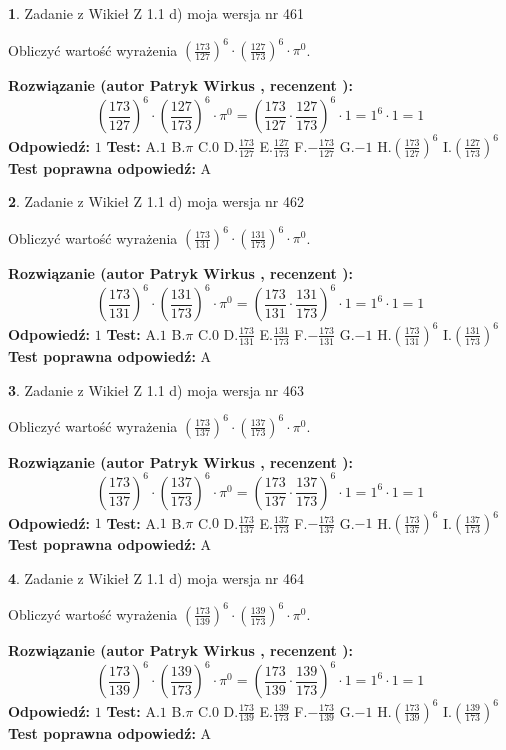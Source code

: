 \documentclass[12pt, a4paper]{article}
\theoremstyle{definition} %
\newtheorem{zad}{}
\newcommand{\zadStart}[1]{\begin{zad}#1\newline}
\newcommand{\zadStop}{\end{zad}}
\newcommand{\rozwStart}[2]{\noindent \textbf{Rozwiązanie (autor #1 , recenzent #2): }\newline}
\newcommand{\rozwStop}{\newline}
\newcommand{\odpStart}{\noindent \textbf{Odpowiedź:}\newline}
\newcommand{\odpStop}{\newline}
\newcommand{\testStart}{\noindent \textbf{Test:}\newline}
\newcommand{\testStop}{\newline}
\newcommand{\kluczStart}{\noindent \textbf{Test poprawna odpowiedź:}\newline}
\newcommand{\kluczStop}{\newline}
\begin{document}
\zadStart{Zadanie z Wikieł Z 1.1 d) moja wersja nr 461}

Obliczyć wartość wyrażenia $(\frac{173}{127})^{6} \cdot (\frac{127}{173})^{6} \cdot \pi^{0}$.
\zadStop
\rozwStart{Patryk Wirkus}{}
$$(\frac{173}{127})^{6} \cdot (\frac{127}{173})^{6} \cdot \pi^{0} = (\frac{173}{127} \cdot \frac{127}{173})^{6} \cdot 1 = 1^{6} \cdot 1 = 1$$
\rozwStop
\odpStart
$1$
\odpStop
\testStart
A.$1$ B.$\pi$ C.$0$ D.$\frac{173}{127}$ E.$\frac{127}{173}$
F.$-\frac{173}{127}$ G.$-1$
H.$(\frac{173}{127})^{6}$
I.$(\frac{127}{173})^{6}$
\testStop
\kluczStart
A
\kluczStop



\zadStart{Zadanie z Wikieł Z 1.1 d) moja wersja nr 462}

Obliczyć wartość wyrażenia $(\frac{173}{131})^{6} \cdot (\frac{131}{173})^{6} \cdot \pi^{0}$.
\zadStop
\rozwStart{Patryk Wirkus}{}
$$(\frac{173}{131})^{6} \cdot (\frac{131}{173})^{6} \cdot \pi^{0} = (\frac{173}{131} \cdot \frac{131}{173})^{6} \cdot 1 = 1^{6} \cdot 1 = 1$$
\rozwStop
\odpStart
$1$
\odpStop
\testStart
A.$1$ B.$\pi$ C.$0$ D.$\frac{173}{131}$ E.$\frac{131}{173}$
F.$-\frac{173}{131}$ G.$-1$
H.$(\frac{173}{131})^{6}$
I.$(\frac{131}{173})^{6}$
\testStop
\kluczStart
A
\kluczStop



\zadStart{Zadanie z Wikieł Z 1.1 d) moja wersja nr 463}

Obliczyć wartość wyrażenia $(\frac{173}{137})^{6} \cdot (\frac{137}{173})^{6} \cdot \pi^{0}$.
\zadStop
\rozwStart{Patryk Wirkus}{}
$$(\frac{173}{137})^{6} \cdot (\frac{137}{173})^{6} \cdot \pi^{0} = (\frac{173}{137} \cdot \frac{137}{173})^{6} \cdot 1 = 1^{6} \cdot 1 = 1$$
\rozwStop
\odpStart
$1$
\odpStop
\testStart
A.$1$ B.$\pi$ C.$0$ D.$\frac{173}{137}$ E.$\frac{137}{173}$
F.$-\frac{173}{137}$ G.$-1$
H.$(\frac{173}{137})^{6}$
I.$(\frac{137}{173})^{6}$
\testStop
\kluczStart
A
\kluczStop



\zadStart{Zadanie z Wikieł Z 1.1 d) moja wersja nr 464}

Obliczyć wartość wyrażenia $(\frac{173}{139})^{6} \cdot (\frac{139}{173})^{6} \cdot \pi^{0}$.
\zadStop
\rozwStart{Patryk Wirkus}{}
$$(\frac{173}{139})^{6} \cdot (\frac{139}{173})^{6} \cdot \pi^{0} = (\frac{173}{139} \cdot \frac{139}{173})^{6} \cdot 1 = 1^{6} \cdot 1 = 1$$
\rozwStop
\odpStart
$1$
\odpStop
\testStart
A.$1$ B.$\pi$ C.$0$ D.$\frac{173}{139}$ E.$\frac{139}{173}$
F.$-\frac{173}{139}$ G.$-1$
H.$(\frac{173}{139})^{6}$
I.$(\frac{139}{173})^{6}$
\testStop
\kluczStart
A
\kluczStop
\end{document}
